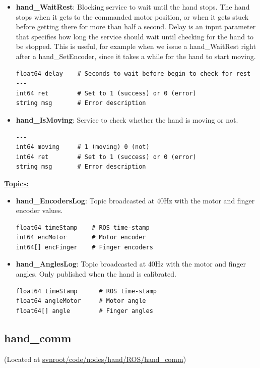 \documentclass[letterpaper,notitlepage,11pt]{article}
\begin{document}
\begin{itemize}
\item \textbf{hand\_WaitRest}: Blocking service to wait until the hand
  stops. The hand stops when it gets to the commanded motor position,
  or when it gets stuck before getting there for more than half a
  second. Delay is an input parameter that specifies how long the
  service should wait until checking for the hand to be stopped. This
  is useful, for example when we issue a hand\_WaitRest right after a
  hand\_SetEncoder, since it takes a while for the hand to start
  moving.

\begin{verbatim}
float64 delay    # Seconds to wait before begin to check for rest
---
int64 ret        # Set to 1 (success) or 0 (error)
string msg       # Error description
\end{verbatim}

\item \textbf{hand\_IsMoving}: Service to check whether the hand is
  moving or not.

\begin{verbatim}
---
int64 moving     # 1 (moving) 0 (not)
int64 ret        # Set to 1 (success) or 0 (error)
string msg       # Error description
\end{verbatim}
\end{itemize}


\textbf{\underline{Topics:}}

\begin{itemize}
\item \textbf{hand\_EncodersLog}: Topic broadcasted at 40Hz with the
  motor and finger encoder values.

\begin{verbatim}
float64 timeStamp    # ROS time-stamp
int64 encMotor       # Motor encoder
int64[] encFinger    # Finger encoders
\end{verbatim}

\item \textbf{hand\_AnglesLog}: Topic broadcasted at 40Hz with the
  motor and finger angles. Only published when the hand is calibrated.

\begin{verbatim}
float64 timeStamp      # ROS time-stamp
float64 angleMotor     # Motor angle
float64[] angle        # Finger angles
\end{verbatim}
\end{itemize}

\subsection{hand\_comm}
\noindent (Located at \url{svnroot/code/nodes/hand/ROS/hand_comm})
\end{document}

